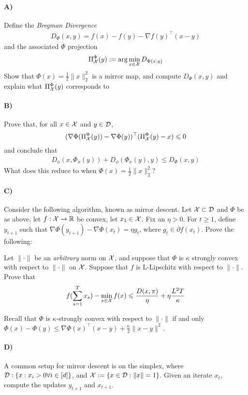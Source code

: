 \documentclass[12pt]{article}
\begin{document}
\paragraph{A)} Define the \emph{Bregman Divergence}
\begin{eqnarray}
D_{\Phi}(x,y) = f(x) - f(y) - \nabla f(y)^{\top}(x-y)
\end{eqnarray}
and the associated $\Phi$ projection
\begin{eqnarray}
\Pi_{{\cal X}}^{\Phi}(y):= \arg\min_{x \in {\cal X}} D_{\Phi(x,y)}
\end{eqnarray}
Show that $\Phi(x) = \frac{1}{2}\|x\|^2_2$ is a mirror map, and compute $D_{\Phi}(x,y)$ and explain what $\Pi_{{\cal X}}^{\Phi}(y)$ corresponds to
\paragraph{B)} Prove that, for all $x \in {\cal X}$ and $y \in {\cal D}$,
\begin{eqnarray}
(\nabla \Phi(\Pi_{{\cal X}}^{\Phi}(y)) - \nabla \Phi(y))^\top(\Pi_{{\cal X}}^{\Phi}(y) - x) \leqslant 0
\end{eqnarray}
and conclude that
\begin{eqnarray}
D_{\phi}(x,\Phi_{x}(y)) + D_{\phi}(\Phi_{x}(y),y) \le D_{\Phi}(x,y) 
\end{eqnarray}
What does this reduce to when $\Phi(x) = \frac{1}{2}\|x\|^2_2$?
\paragraph{C)} Consider the following algorithm, known as mirror descent. Let ${\cal X} \subset {\cal D}$ and $\Phi$ be as above, let $f: {\cal X} \to \mathbb{R}$ be convex, let $x_1  \in {\cal X}$. Fix an $\eta > 0$. For $t \ge 1$, define $y_{t+1}$ such that $\nabla \Phi(y_{t+1}) - \nabla \Phi(x_{t}) = \eta g_t$, where $g_t \in \partial f(x_t)$. Prove the following:
\begin{theorem*} Let $\|\cdot\|$ be an \emph{arbitrary} norm on ${\cal X}$, and suppose that $\Phi$ is $\kappa$ strongly convex with respect to $\|\cdot\|$ on ${\cal X}$. Suppose that $f$ is L-Lipschitz with respect to $\|\cdot\|$. Prove that 
\begin{eqnarray}
f(\sum_{s=1}^T x_s) - \min_{x \in {\cal X}} f(x) \leqslant \frac{D(x,\pi)}{\eta} + \eta \frac{L^2 T}{\kappa}
\end{eqnarray}
\end{theorem*}
Recall that $\Phi$ is $\kappa$-strongly convex with respect to $\|\cdot\|$ if and only $\Phi(x)  - \Phi(y) \le \nabla \Phi(x)^\top (x-y) + \frac{\kappa}{2}\|x-y\|^2$. 
\paragraph{D)} A common setup for mirror descent is on the simplex, where ${\cal D}: \{x: x_i > 0 \forall i \in [d]\}$, and ${\cal X} := \{x \in {\cal D}:\|x\| = 1\}$. Given an iterate $x_t$, compute the updates $y_{t+1}$ and $x_{t+1}$. 
\end{document}
